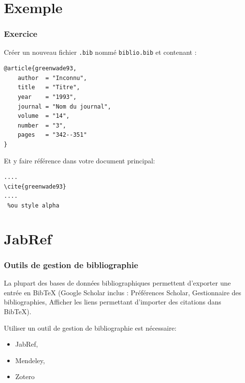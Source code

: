 \documentclass{beamer}
\begin{document}

\section{Exemple}


\begin{frame}[fragile]
\frametitle{Exercice}

Créer un nouveau fichier \lstinline?.bib? nommé \lstinline?biblio.bib? et contenant : 

\begin{lstlisting}
@article{greenwade93,
    author  = "Inconnu",
    title   = "Titre",
    year    = "1993",
    journal = "Nom du journal",
    volume  = "14",
    number  = "3",
    pages   = "342--351"
}
\end{lstlisting}

Et y faire référence dans votre document principal:

\begin{lstlisting}
....
\cite{greenwade93}
....
 %ou style alpha

\end{lstlisting}

\end{frame}



\section{JabRef}


\begin{frame}
\frametitle{Outils de gestion de bibliographie}

La plupart des bases de données bibliographiques permettent d'exporter une entrée en BibTeX (Google Scholar inclus : Préférences Scholar,  Gestionnaire des bibliographies,  Afficher les liens permettant d'importer des citations dans BibTeX).

\medskip
Utiliser un outil de gestion de bibliographie est nécessaire:
\begin{itemize}
\item JabRef,
\item Mendeley,
\item Zotero
\end{itemize}
\end{frame}

\end{document}
